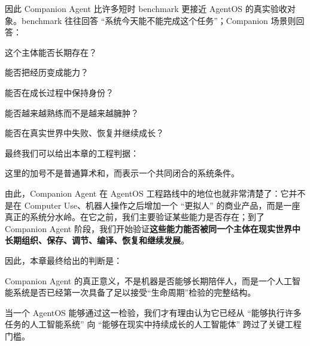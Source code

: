 因此 Companion Agent 比许多短时 benchmark 更接近 AgentOS 的真实验收对象。benchmark 往往回答 ``系统今天能不能完成这个任务''；Companion 场景则回答：

\begin{statementbox}
这个主体能否长期存在？
\end{statementbox}

\begin{statementbox}
能否把经历变成能力？
\end{statementbox}

\begin{statementbox}
能否在成长过程中保持身份？
\end{statementbox}

\begin{statementbox}
能否越来越熟练而不是越来越臃肿？
\end{statementbox}

\begin{statementbox}
能否在真实世界中失败、恢复并继续成长？
\end{statementbox}

最终我们可以给出本章的工程判据：

\begin{statementbox}
\centering
{}
\end{statementbox}

这里的加号不是普通算术和，而表示一个共同闭合的系统条件。

由此，Companion Agent 在 AgentOS 工程路线中的地位也就非常清楚了：它并不是在 Computer Use、机器人操作之后增加一个 ``更拟人'' 的商业产品，而是一座真正的系统分水岭。在它之前，我们主要验证某些能力是否存在；到了 Companion Agent 阶段，我们开始验证\textbf{这些能力能否被同一个主体在现实世界中长期组织、保存、调节、编译、恢复和继续发展}。

因此，本章最终给出的判断是：

\begin{proposition*}
Companion Agent 的真正意义，不是机器是否能够长期陪伴人，而是一个人工智能系统是否已经第一次具备了足以接受“生命周期”检验的完整结构。
\end{proposition*}

当一个 AgentOS 能够通过这一检验，我们才有理由认为它已经从 ``能够执行许多任务的人工智能系统'' 向 ``能够在现实中持续成长的人工智能体'' 跨过了关键工程门槛。

